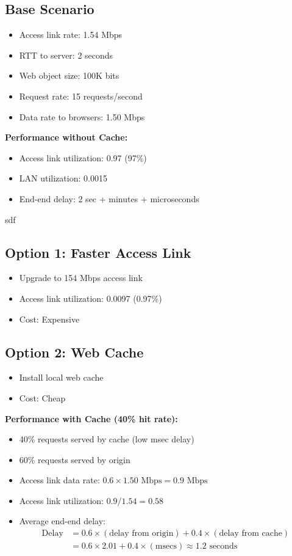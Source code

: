 \documentclass[12pt]{article}
\begin{document}
\subsection{Base Scenario}
\begin{itemize}
    \item Access link rate: 1.54 Mbps
    \item RTT to server: 2 seconds
    \item Web object size: 100K bits
    \item Request rate: 15 requests/second
    \item Data rate to browsers: 1.50 Mbps
\end{itemize}

\textbf{Performance without Cache:}
\begin{itemize}
    \item Access link utilization: 0.97 (97\%)
    \item LAN utilization: 0.0015
    \item End-end delay: 2 sec + minutes + microseconds
\end{itemize}
sdf
\subsection{Option 1: Faster Access Link}
\begin{itemize}
    \item Upgrade to 154 Mbps access link
    \item Access link utilization: 0.0097 (0.97\%)
    \item Cost: Expensive
\end{itemize}

\subsection{Option 2: Web Cache}
\begin{itemize}
    \item Install local web cache
    \item Cost: Cheap
\end{itemize}

\textbf{Performance with Cache (40\% hit rate):}
\begin{itemize}
    \item 40\% requests served by cache (low msec delay)
    \item 60\% requests served by origin
    \item Access link data rate: $0.6 \times 1.50 \text{ Mbps} = 0.9 \text{ Mbps}$
    \item Access link utilization: $0.9 / 1.54 = 0.58$
    \item Average end-end delay:
          \[
              \begin{aligned}
                  \text{Delay} & = 0.6 \times (\text{delay from origin}) + 0.4 \times (\text{delay from cache}) \\
                               & = 0.6 \times 2.01 + 0.4 \times (\text{msecs}) \approx 1.2 \text{ seconds}
              \end{aligned}
          \]
\end{itemize}
\end{document}
